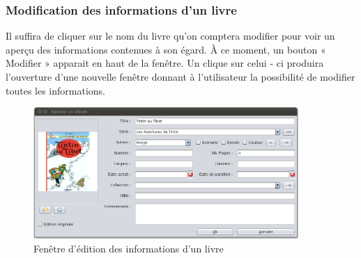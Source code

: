 \subsubsection {Modification des informations d'un livre}
Il suffira de cliquer sur le nom du livre qu'on comptera modifier pour voir un aperçu des informations contenues à son égard.
À ce moment, un bouton « Modifier » apparait en haut de la fenêtre.
Un clique sur celui - ci produira l'ouverture d'une nouvelle fenêtre donnant à l'utilisateur la possibilité de modifier toutes les informations.

\begin{figure}[h]
\begin{center}
\includegraphics[height=5cm]{../img/editionAlbum.png}
\end{center}
\caption{Fenêtre d'édition des informations d'un livre}
\end{figure}
